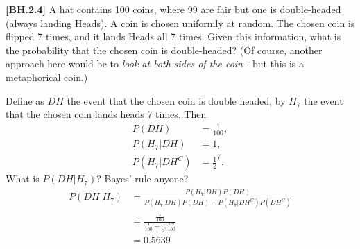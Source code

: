 

\setcounter{theorem}{3}

\begin{exercise}
	\textbf{[BH.2.4]} A hat contains 100 coins, where 99 are fair but one is double-headed (always landing Heads). A coin is chosen uniformly at random. The chosen coin is flipped 7 times, and it lands Heads all 7 times. Given this information, what is the probability that the chosen coin is double-headed? (Of course, another approach here would be to \emph{look at both sides of the coin} - but this is a metaphorical coin.)
\begin{solution}
	Define as $DH$ the event that the chosen coin is double headed, by $H_{7}$ the event that the chosen coin lands heads 7 times. Then
	\begin{align*}
		P(DH) &= \frac{1}{100},\\
		P(H_{7}|DH) & = 1,\\
		P(H_{7}|DH^{C}) & = \frac{1}{2}^7.
	\end{align*}
	What is $P(DH|H_{7})$? Bayes' rule anyone?
	\begin{align*}
		P(DH|H_{7}) &= \frac{P(H_{7}|DH)P(DH)}{P(H_{7}|DH)P(DH) + P(H_{7}|DH^{C})P(DH^{C})}\\
		& = \frac{\frac{1}{100}}{\frac{1}{100} + \frac{1}{2^7}\frac{99}{100}}\\
		& = 0.5639
	\end{align*}
\end{solution}
\end{exercise}


